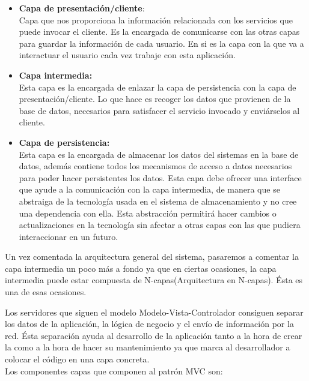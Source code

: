 \begin{itemize}
\item \textbf{Capa de presentación/cliente}:\\
Capa que nos proporciona la información relacionada con los servicios que puede invocar el cliente. Es la encargada de comunicarse con las otras capas para guardar la información de cada usuario. En si es la capa con la que va a interactuar el usuario cada vez trabaje con esta aplicación.

\item \textbf{Capa intermedia:}\\
Esta capa es la encargada de enlazar la capa de persistencia con la capa de presentación/cliente. Lo que hace es recoger los datos que provienen de la base de datos, necesarios para satisfacer el servicio invocado y enviárselos al cliente.

\item \textbf{Capa de persistencia:}\\
Esta capa es la encargada de almacenar los datos del sistemas en la base de datos, además contiene todos los mecanismos de acceso a datos necesarios para poder hacer persistentes los datos.
 Esta capa debe ofrecer una interface que ayude a la comunicación con la capa intermedia, de manera que se abstraiga de la tecnología usada en el sistema de almacenamiento y no cree una dependencia con ella. Esta abstracción permitirá hacer cambios o actualizaciones en la tecnología sin afectar a otras capas con las que pudiera interaccionar en un futuro.\\
 


\end{itemize}
Un vez comentada la arquitectura general del sistema, pasaremos a comentar la capa intermedia un poco más a fondo ya que en ciertas ocasiones, la capa intermedia puede estar compuesta de N-capas(Arquitectura en N-capas). Ésta es una de esas ocasiones.

Los servidores que siguen el modelo Modelo-Vista-Controlador consiguen separar los datos de la  aplicación, la lógica de negocio  y el envío  de información por la red.
Ésta separación ayuda al desarrollo de la aplicación tanto a la hora de crear la como a la hora de hacer su mantenimiento ya que marca al desarrollador a colocar el código en una capa concreta. \\


Los componentes capas que componen al patrón MVC son:

